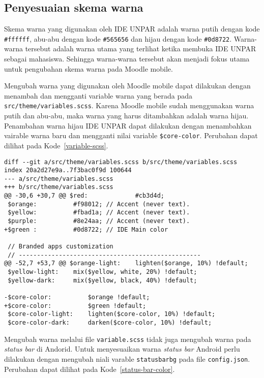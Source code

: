 \subsection{Penyesuaian skema warna}
Skema warna yang digunakan oleh IDE UNPAR adalah warna putih dengan kode \texttt{\#ffffff}, abu-abu dengan kode \texttt{\#565656} dan hijau dengan kode \texttt{\#0d8722}.  Warna-warna tersebut adalah warna utama yang terlihat ketika membuka IDE UNPAR sebagai mahasiswa. Sehingga warna-warna tersebut akan menjadi fokus utama untuk pengubahan skema warna pada Moodle mobile.

Mengubah warna yang digunakan oleh Moodle mobile dapat dilakukan dengan menambah dan mengganti variable warna yang berada pada \texttt{src/theme/variables.scss}. Karena Moodle mobile sudah menggunakan warna putih dan abu-abu, maka warna yang harus ditambahkan adalah warna hijau. Penambahan warna hijau IDE UNPAR dapat dilakukan dengan menambahkan vairable warna baru dan mengganti nilai variable \texttt{\$core-color}. Perubahan dapat dilihat pada \mbox{Kode \ref{variable-scss}}.

\begin{lstlisting}[frame=single, label ={variable-scss}, caption = Mengubah warna utama menjadi warna hijau ]
diff --git a/src/theme/variables.scss b/src/theme/variables.scss
index 20a2d27e9a..7f3bac0f9d 100644
--- a/src/theme/variables.scss
+++ b/src/theme/variables.scss
@@ -30,6 +30,7 @@ $red:             #cb3d4d;
 $orange:          #f98012; // Accent (never text).
 $yellow:          #fbad1a; // Accent (never text).
 $purple:          #8e24aa; // Accent (never text).
+$green :          #0d8722; // IDE Main color
 
 // Branded apps customization
 // --------------------------------------------------
@@ -52,7 +53,7 @@ $orange-light:    lighten($orange, 10%) !default;
 $yellow-light:    mix($yellow, white, 20%) !default;
 $yellow-dark:     mix($yellow, black, 40%) !default;
 
-$core-color:          $orange !default;
+$core-color:          $green !default;
 $core-color-light:    lighten($core-color, 10%) !default;
 $core-color-dark:     darken($core-color, 10%) !default;
\end{lstlisting}

Mengubah warna melalui file \texttt{variable.scss} tidak juga mengubah warna pada \textit{status bar} di Andorid. Untuk menyesuaikan warna \textit{status bar} Android perlu dilakukan dengan mengubah niali varable \texttt{statusbarbg} pada file \texttt{config.json}. Perubahan dapat dilihat pada \mbox{Kode \ref{status-bar-color}}. 

